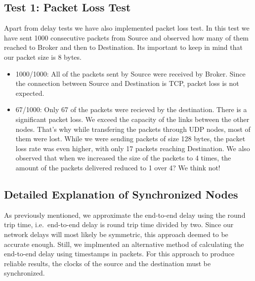\documentclass[conference]{IEEEtran}
\begin{document}
\subsection{Test 1: Packet Loss Test}\label{AA}

Apart from delay tests we have also implemented packet loss test. In this test we have sent 1000 consecutive packets from Source and observed how many of them reached to Broker and then to Destination. Its important to keep in mind that our packet size is 8 bytes. 
\begin{itemize}
\item 1000/1000: All of the packets sent by Source were received by Broker. Since the connection between Source and Destination is TCP, packet loss is not expected.
\item 67/1000: Only 67 of the packets were recieved by the destination. There is a significant packet loss. We exceed the capacity of the links between the other nodes. That's why while transfering the packets through UDP nodes, most of them were lost. While we were sending packets of size 128 bytes, the packet loss rate was even higher, with only 17 packets reaching Destination. We also observed that when we increased the size of the packets to 4 times, the amount of the packets delivered reduced to 1 over 4? We think not!
\end{itemize}

\subsection{Detailed Explanation of Synchronized Nodes}
As previously mentioned, we approximate the end-to-end delay using the round trip time, i.e.\
end-to-end delay is round trip time divided by two. Since our network delays will
most likely be symmetric, this approach deemed to be accurate enough. Still,
we implmented an alternative method of calculating the end-to-end delay using
timestamps in packets. For this approach to produce reliable results, the clocks
of the source and the destination must be synchronized.
\end{document}

